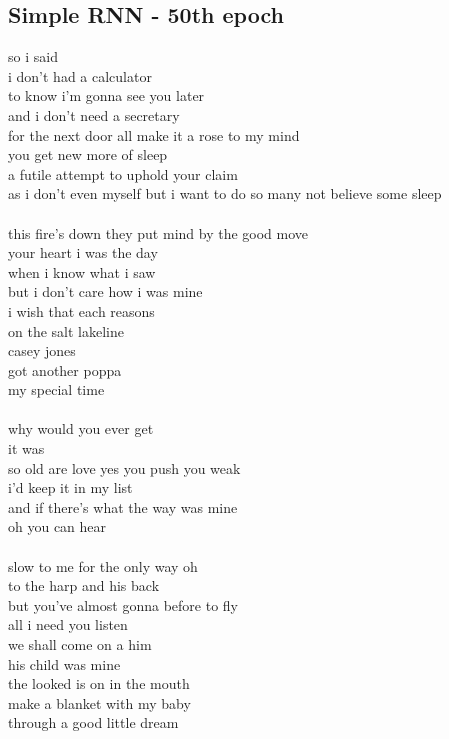 \documentclass[conference]{IEEEtran}
\begin{document}
\subsection{Simple RNN - 50th epoch}\label{RNN50}
so i said \\
i don't had a calculator \\
to know i'm gonna see you later \\
and i don't need a secretary \\
for the next door all make it a rose to my mind \\
you get new more of sleep \\
a futile attempt to uphold your claim \\
as i don't even myself but i want to do so many not believe some sleep \\
\\
this fire's down they put mind by the good move \\
your heart i was the day \\
when i know what i saw \\
but i don't care how i was mine \\
i wish that each reasons \\
on the salt lakeline \\
casey jones \\
got another poppa \\
my special time \\
\\
why would you ever get \\
it was \\
so old are love yes you push you weak \\
i'd keep it in my list \\
and if there's what the way was mine \\
oh you can hear \\
\\
slow to me for the only way oh \\
to the harp and his back \\
but you've almost gonna before to fly \\
all i need you listen \\
we shall come on a him \\
his child was mine \\
the looked is on in the mouth \\
make a blanket with my baby \\
through a good little dream \\
\end{document}
